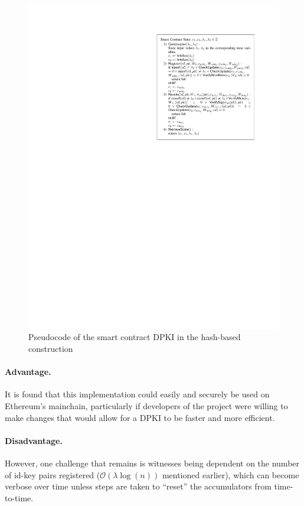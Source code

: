 \documentclass[lang=en]{sjtuarticle}
\begin{document}
\begin{figure}[h]
    \centering
    \includegraphics{smart.pdf}
    \caption{Pseudocode of the smart contract DPKI in the hash-based construction}
    \label{fig:smart}
\end{figure}

\paragraph{Advantage.}

It is found that this implementation could easily and securely be used on
Ethereum's mainchain, particularly if developers of the project were willing to make changes that would allow for a DPKI to be faster and more efficient.

\paragraph{Disadvantage.}

However, one challenge that remains is
witnesses being dependent on the number of id-key pairs registered ($\mathcal{O}(\lambda\log(n))$ mentioned earlier), which can become verbose over
time unless steps are taken to ``reset'' the accumulators from time-to-time.
\end{document}
